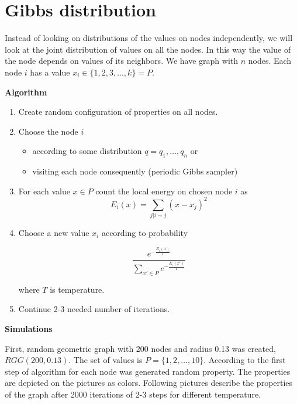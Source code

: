 \documentclass[12pt]{report}
\begin{document}
\section{Gibbs distribution}

Instead of looking on distributions of the values on nodes independently, we will look at the joint distribution of values on all the nodes. 
In this way the value of the node depends on values of its neighbors.
We have graph with $n$ nodes. Each node $i$ has a value $x_i \in \lbrace 1, 2, 3, ..., k \rbrace = P$. 


\textbf{Algorithm} 

\begin{enumerate}
  \item Create random configuration of properties on all nodes.
  \item Choose the node $i$
  
 	 \begin{itemize}
		\item according to some distribution $q = q_1, ..., q_n$ or
		\item visiting each node consequently (periodic Gibbs sampler)
 	 \end{itemize}
  
  \item For each value $x \in P$ count the local energy on chosen node $i$ as 
  $$ E_i(x) = \sum\limits_{j | i \sim j}  (x - x_j)^2 $$  
  
  \item Choose a new value $x_i$ according to probability
  
  $$ \frac{ e^{-\frac{E_i(x)}{T}} }{ \sum\limits_{x'\in P} e^{-\frac{E_i(x')}{T}}} $$
  
	where $T$ is temperature.
\item Continue 2-3 needed number of iterations.
\end{enumerate}


\textbf{Simulations}

First, random geometric graph with 200 nodes and radius 0.13 was created, $RGG(200, 0.13)$. The set of values is $P = \lbrace 1, 2, ..., 10 \rbrace$. According to the first step of algorithm for each node was generated random property. The properties are depicted on the pictures as colors. Following pictures describe the properties of the graph after 2000 iterations of 2-3 steps for different temperature.
\end{document}
